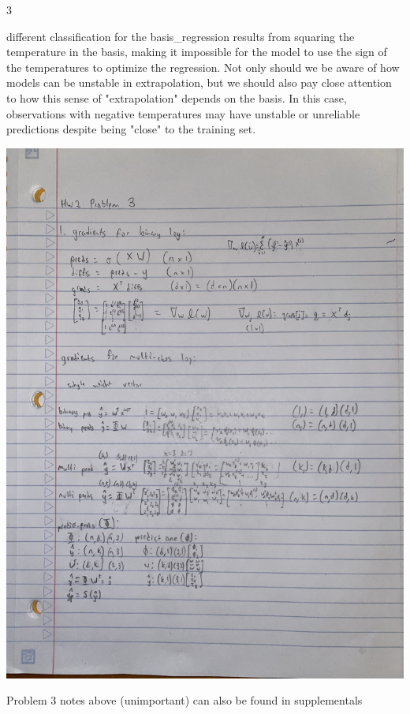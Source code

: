 \documentclass[submit]{harvardml}
\begin{document}
\begin{sol}{}{3}
\begin{enumerate}
    different classification for the basis\_regression results from squaring the temperature
    in the basis, making it impossible for the model to use the sign of the temperatures
    to optimize the regression. Not only should we be aware of how models can be unstable
    in extrapolation, but we should also pay close attention to how this sense of "extrapolation"
    depends on the basis. In this case, observations with negative temperatures may have unstable 
    or unreliable predictions despite being "close" to the training set.
  \end{enumerate}
  \includegraphics[angle=270,width=0.5\linewidth]{images/Problem_3_1.JPG}

  Problem 3 notes above (unimportant) can also be found in supplementals
\end{sol}
\end{document}

